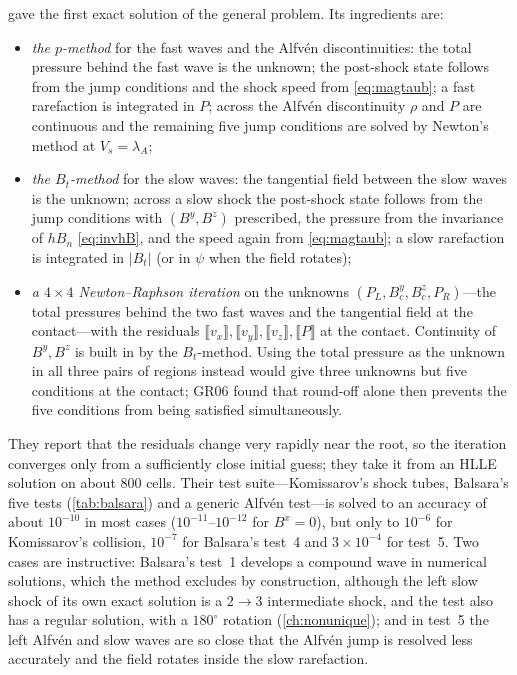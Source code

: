 \documentclass[11pt,a4paper,oneside,openany]{book}
\newcommand{\textcite}{\citet}
\theoremstyle{definition}
\theoremstyle{plain}
\theoremstyle{remark}
\newcommand{\jump}[1]{\llbracket #1\rrbracket}
\newcommand{\Ptot}{P}
\begin{document}
\textcite{GiacomazzoRezzolla2006} gave the first exact solution of the general problem.
Its ingredients are:
\begin{itemize}[nosep]
\item \emph{the $p$-method} for the fast waves and the Alfvén discontinuities: the total
  pressure behind the fast wave is the unknown; the post-shock state follows from the jump
  conditions and the shock speed from \eqref{eq:magtaub}; a fast rarefaction is integrated
  in $\Ptot$; across the Alfvén discontinuity $\rho$ and $\Ptot$ are continuous and the
  remaining five jump conditions are solved by Newton's method at $V_s=\lambda_A$;
\item \emph{the $B_t$-method} for the slow waves: the tangential field between the slow
  waves is the unknown; across a slow shock the post-shock state follows from the jump
  conditions with $(B^y,B^z)$ prescribed, the pressure from the invariance of $hB_n$
  \eqref{eq:invhB}, and the speed again from \eqref{eq:magtaub}; a slow rarefaction is
  integrated in $|B_t|$ (or in $\psi$ when the field rotates);
\item \emph{a $4\times4$ Newton--Raphson iteration} on the unknowns $(\Ptot_L,B^y_c,B^z_c,
  \Ptot_R)$---the total pressures behind the two fast waves and the tangential field at the
  contact---with the residuals $\jump{v_x},\jump{v_y},\jump{v_z},\jump{\Ptot}$ at the
  contact. Continuity of $B^y,B^z$ is built in by the $B_t$-method. Using the total pressure
  as the unknown in all three pairs of regions instead would give three unknowns but five
  conditions at the contact; GR06 found that round-off alone then prevents the five
  conditions from being satisfied simultaneously.
\end{itemize}
They report that the residuals change very rapidly near the root, so the iteration
converges only from a sufficiently close initial guess; they take it from an HLLE solution
on about 800 cells. Their test suite---Komissarov's shock tubes, Balsara's five tests
(\cref{tab:balsara}) and a generic Alfvén test---is solved to an accuracy of about
$10^{-10}$ in most cases ($10^{-11}$--$10^{-12}$ for $B^x=0$), but only to $10^{-6}$ for
Komissarov's collision, $10^{-7}$ for Balsara's test~4 and $3\times10^{-4}$ for test~5. Two
cases are instructive: Balsara's test~1 develops a compound wave in numerical solutions,
which the method excludes by construction, although the left slow shock of its own exact
solution is a $2\to3$ intermediate shock, and the test also has a regular solution, with a
$180^\circ$ rotation (\cref{ch:nonunique}); and in test~5 the left
Alfvén and slow waves are so close that the Alfvén jump is resolved less accurately and the
field rotates inside the slow rarefaction.
\end{document}
